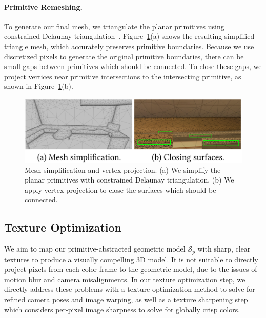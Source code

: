 \paragraph*{Primitive Remeshing.}
To generate our final mesh, we triangulate the planar primitives using constrained Delaunay triangulation~\cite{chew1987constrained}. 
Figure~\ref{fig:3dlite-remesh}(a) shows the resulting simplified triangle mesh, which accurately preserves primitive boundaries.
Because we use discretized pixels to generate the original primitive boundaries, there can be small gaps between primitives which should be connected. 
To close these gaps, we project vertices near primitive intersections to the intersecting primitive, as shown in Figure~\ref{fig:3dlite-remesh}(b).
\begin{figure}
\centering
\includegraphics[width=0.8\linewidth]{3dlite/fig12.png}
\caption{Mesh simplification and vertex projection. (a) We simplify the planar primitives with constrained Delaunay triangulation. (b) We apply vertex projection to close the surfaces which should be connected.}
\label{fig:3dlite-remesh}
\end{figure}

\subsection{Texture Optimization}
\label{sec:approach-texture}

We aim to map our primitive-abstracted geometric model $\mathcal{S}_p$ with sharp, clear textures to produce a visually compelling 3D model.
It is not suitable to directly project pixels from each color frame to the geometric model, due to the issues of motion blur and camera misalignments.
In our texture optimization step, we directly address these problems with a texture optimization method to solve for refined camera poses and image warping, as well as a texture sharpening step which considers per-pixel image sharpness to solve for globally crisp colors.

